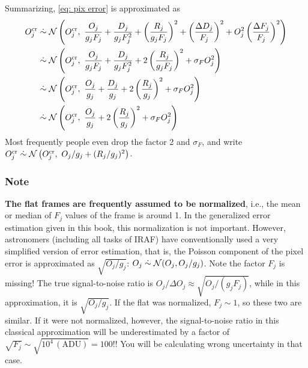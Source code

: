 Summarizing, \cref{eq: pix error} is approximated as
\begin{equation} 
\begin{aligned}
  O_j^\mathrm{cr} 
    &\mathrel{\dot{\sim}} \mathcal{N} 
      \left ( O_j^\mathrm{cr},~ 
        \frac{O_j}{g_jF_j} 
        + \frac{D_j}{g_j F_j^2} 
        + \left (\frac{R_j}{g_j F_j} \right )^2 
        + \left  (\frac{\Delta D_j}{F_j} \right )^2 
        + O_j^2 \left (\frac{\Delta F_j}{F_j} \right )^2
        \right ) \\
    &\mathrel{\dot{\sim}} \mathcal{N} 
      \left ( O_j^\mathrm{cr},~ 
        \frac{O_j}{g_jF_j} 
        + \frac{D_j}{g_j F_j^2} 
        + 2 \left (\frac{R_j}{g_j F_j} \right )^2
        + \sigma_F O_j^2 
        \right ) \\
    &\mathrel{\dot{\sim}} \mathcal{N} 
      \left ( O_j^\mathrm{cr},~ 
        \frac{O_j}{g_j} 
        + \frac{D_j}{g_j } 
        + 2 \left (\frac{R_j}{g_j} \right )^2
        + \sigma_F O_j^2
        \right ) \\
    &\mathrel{\dot{\sim}} \mathcal{N} 
      \left ( O_j^\mathrm{cr},~ 
        \frac{O_j}{g_j} 
        + 2 \left (\frac{R_j}{g_j} \right )^2
        + \sigma_F O_j^2
        \right ) \\
\end{aligned}
\end{equation}
Most frequently people even drop the factor 2 and $ \sigma_F $, and write $ O_j^\mathrm{cr} \mathrel{\dot{\sim}} \mathcal{N} \left ( O_j^\mathrm{cr},~ O_j/g_j + (R_j/g_j)^2 \right ) $. 

\subsubsection{Note}
\textbf{The flat frames are frequently assumed to be normalized}, i.e., the mean or median of $ F_j $ values of the frame is around 1. In the generalized error estimation given in this book, this normalization is not important. However, astronomers (including all tasks of IRAF) have conventionally used a very simplified version of error estimation, that is, the Poisson component of the pixel error is approximated as $ \sqrt{O_j/g_j} $: $ O_j \mathrel{\dot{\sim}} \mathcal{N} (O_j, O_j/g_j) $. Note the factor $ F_j $ is missing! The true signal-to-noise ratio is $ O_j / \Delta O_j \approx \sqrt{O_j / (g_j F_j)} $, while in this approximation, it is $ \sqrt{O_j / g_j} $. If the flat was normalized, $ F_j \sim 1 $, so these two are similar. If it were not normalized, however, the signal-to-noise ratio in this classical approximation will be underestimated by a factor of $ \sqrt{F_j} \sim \sqrt{10^4 \,(\mathrm{ADU})} = 100 $!! You will be calculating wrong uncertainty in that case.


